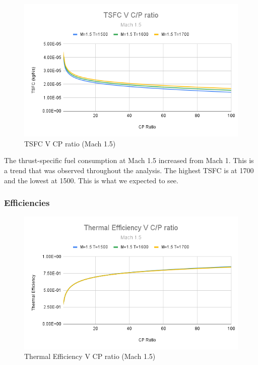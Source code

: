 \documentclass[12pt]{report}
\begin{document}
\begin{figure}[H]
    \centering
    \includegraphics[width=15.5 cm]{TSFC V C_P ratio (Mach 1.5).png}
    \caption{TSFC V CP ratio (Mach 1.5)}
    \label{fig:TSFC V C_P ratio (Mach 1.5)}
\end{figure}



The thrust-specific fuel consumption at Mach 1.5 increased from Mach 1. This is a trend that was observed throughout the analysis. The highest TSFC is at 1700 and the lowest at 1500.  This is what we expected to see.


\subsubsection{Efficiencies}


\begin{figure}[H]
    \centering
    \includegraphics[width=15.5 cm]{Thermal Efficiency V C_P ratio (Mach 1.5).png}
    \caption{Thermal Efficiency V CP ratio (Mach 1.5)}
    \label{fig: Thermal Efficiency V CP ratio (Mach 1.5)}
\end{figure}
\end{document}
